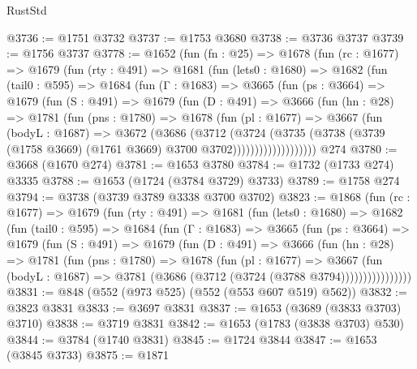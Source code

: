 \begin{lexlean}{RustStd}
\begin{coremodule}
@3736 := @1751 @3732
@3737 := @1753 @3680
@3738 := @3736 @3737
@3739 := @1756 @3737
@3778 := @1652
    (fun (fn : @25) =>
    @1678
      (fun (rc : @1677) =>
      @1679
        (fun (rty : @491) =>
        @1681
          (fun (lets0 : @1680) =>
          @1682
            (fun (tail0 : @595) =>
            @1684
              (fun (Γ : @1683) =>
              @3665
                (fun (ps : @3664) =>
                @1679
                  (fun (S : @491) =>
                  @1679
                    (fun (D : @491) =>
                    @3666
                      (fun (hn : @28) =>
                      @1781
                        (fun (pns : @1780) =>
                        @1678
                          (fun (pl : @1677) =>
                          @3667
                            (fun (bodyL : @1687) =>
                            @3672
                              (@3686
                                (@3712
                                  (@3724
                                    (@3735
                                      (@3738
                                        (@3739
                                          (@1758 @3669)
                                          (@1761 @3669)
                                          @3700
                                          @3702)))))))))))))))))))
    @274
@3780 := @3668 (@1670 @274)
@3781 := @1653 @3780
@3784 := @1732 (@1733 @274) @3335
@3788 := @1653 (@1724 (@3784 @3729) @3733)
@3789 := @1758 @274
@3794 := @3738 (@3739 @3789 @3338 @3700 @3702)
@3823 := @1868
    (fun (rc : @1677) =>
    @1679
      (fun (rty : @491) =>
      @1681
        (fun (lets0 : @1680) =>
        @1682
          (fun (tail0 : @595) =>
          @1684
            (fun (Γ : @1683) =>
            @3665
              (fun (ps : @3664) =>
              @1679
                (fun (S : @491) =>
                @1679
                  (fun (D : @491) =>
                  @3666
                    (fun (hn : @28) =>
                    @1781
                      (fun (pns : @1780) =>
                      @1678
                        (fun (pl : @1677) =>
                        @3667
                          (fun (bodyL : @1687) =>
                          @3781 (@3686 (@3712 (@3724 (@3788 @3794))))))))))))))))
@3831 := @848 (@552 (@973 @525) (@552 (@553 @607 @519) @562))
@3832 := @3823 @3831
@3833 := @3697 @3831
@3837 := @1653 (@3689 (@3833 @3703) @3710)
@3838 := @3719 @3831
@3842 := @1653 (@1783 (@3838 @3703) @530)
@3844 := @3784 (@1740 @3831)
@3845 := @1724 @3844
@3847 := @1653 (@3845 @3733)
@3875 := @1871

\end{coremodule}
\end{lexlean}

